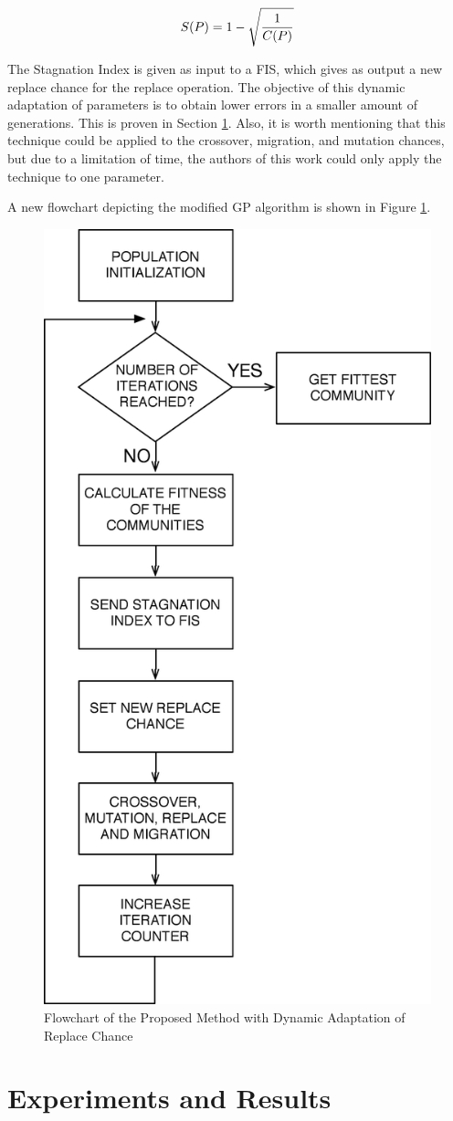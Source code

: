 \documentclass[12pt,journal,draftcls,onecolumn]{IEEEtran}
\begin{document}
\begin{equation} \label{si}
S(P) = 1 - \sqrt{1 \over C(P)}
\end{equation}

The Stagnation Index is given as input to a FIS, which gives as output a new replace chance for the replace operation. The objective of this dynamic adaptation of parameters is to obtain lower errors in a smaller amount of generations. This is proven in Section \ref{experiments-and-results}. Also, it is worth mentioning that this technique could be applied to the crossover, migration, and mutation chances, but due to a limitation of time, the authors of this work could only apply the technique to one parameter.

A new flowchart depicting the modified GP algorithm is shown in Figure \ref{flowchart-with-dynamic}.

\begin{figure}[h!]
\caption{Flowchart of the Proposed Method with Dynamic Adaptation of
  Replace Chance}
\label{flowchart-with-dynamic}
\begin{center}
\includegraphics[width=0.4\columnwidth]{figures/flowchart-with/flowchart-with.png}
\end{center}
\end{figure}

\section{Experiments and Results}
\label{experiments-and-results}
\end{document}
